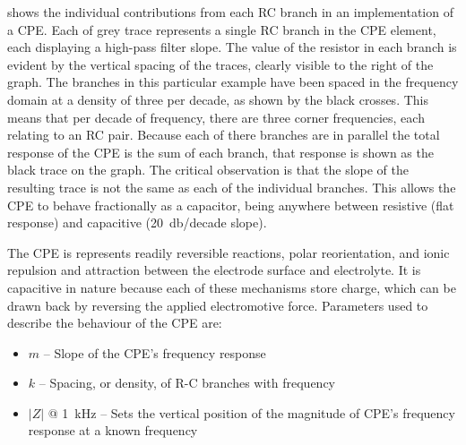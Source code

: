        shows the individual contributions from each RC branch in an implementation of a CPE.
      Each of grey trace represents a single RC branch in the CPE element, each displaying a high-pass filter slope.
      The value of the resistor in each branch is evident by the vertical spacing of the traces, clearly visible to the right of the graph.
      The branches in this particular example have been spaced in the frequency domain at a density of three per decade, as shown by the black crosses.
      This means that per decade of frequency, there are three corner frequencies, each relating to an RC pair.
      Because each of there branches are in parallel the total response of the CPE is the sum of each branch, that response is shown as the black trace on the graph.
      The critical observation is that the slope of the resulting trace is not the same as each of the individual branches.
      This allows the CPE to behave fractionally as a capacitor, being anywhere between resistive (flat response) and capacitive (\SI{20}{\decibel}/decade slope).

      The CPE is represents readily reversible reactions, polar reorientation, and ionic repulsion and attraction between the electrode surface and electrolyte.
      It is capacitive in nature because each of these mechanisms store charge, which can be drawn back by reversing the applied electromotive force.
      Parameters used to describe the behaviour of the CPE are:
      \begin{itemize}
        \item $m$ -- Slope of the CPE's frequency response
        \item $k$ -- Spacing, or density, of R-C branches with frequency
        \item $|Z|$ @ \SI{1}{\kilo\hertz} -- Sets the vertical position of the magnitude of CPE's frequency response at a known frequency
      \end{itemize}


